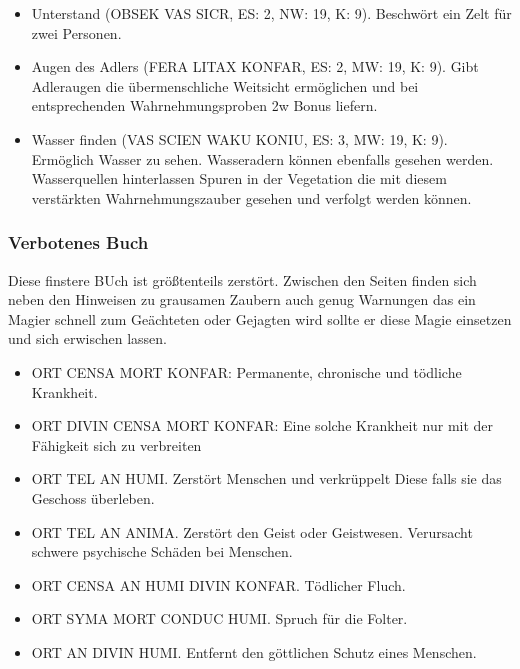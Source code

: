 \documentclass{article}
\begin{document}
\begin{itemize}
\item Unterstand (OBSEK VAS SICR, ES: 2, NW: 19, K: 9). Beschwört ein Zelt für zwei Personen.
\end{itemize}

\begin{itemize}
\item Augen des Adlers (FERA LITAX KONFAR, ES: 2, MW: 19, K: 9). Gibt Adleraugen die übermenschliche Weitsicht ermöglichen und bei entsprechenden Wahrnehmungsproben 2w Bonus liefern.
\end{itemize}

\begin{itemize}
\item Wasser finden (VAS SCIEN WAKU KONIU, ES: 3, MW: 19, K: 9). Ermöglich Wasser zu sehen. Wasseradern können ebenfalls gesehen werden. Wasserquellen hinterlassen Spuren in der Vegetation die mit diesem verstärkten Wahrnehmungszauber gesehen und verfolgt werden können.
\end{itemize}

\subsubsection{Verbotenes Buch}

Diese finstere BUch ist größtenteils zerstört. Zwischen den Seiten finden sich neben den Hinweisen zu grausamen Zaubern
auch genug Warnungen das ein Magier schnell zum Geächteten oder Gejagten wird sollte er diese Magie einsetzen und sich
erwischen lassen.

\begin{itemize}
\item ORT CENSA MORT KONFAR: Permanente, chronische und tödliche Krankheit.
\item ORT DIVIN CENSA MORT KONFAR: Eine solche Krankheit nur mit der Fähigkeit sich zu verbreiten
\item ORT TEL AN HUMI. Zerstört Menschen und verkrüppelt Diese falls sie das Geschoss überleben.
\item ORT TEL AN ANIMA. Zerstört den Geist oder Geistwesen. Verursacht schwere psychische Schäden bei Menschen.
\item ORT CENSA AN HUMI DIVIN KONFAR. Tödlicher Fluch.
\item ORT SYMA MORT CONDUC HUMI. Spruch für die Folter.
\item ORT AN DIVIN HUMI. Entfernt den göttlichen Schutz eines Menschen.
\end{itemize}
\end{document}
